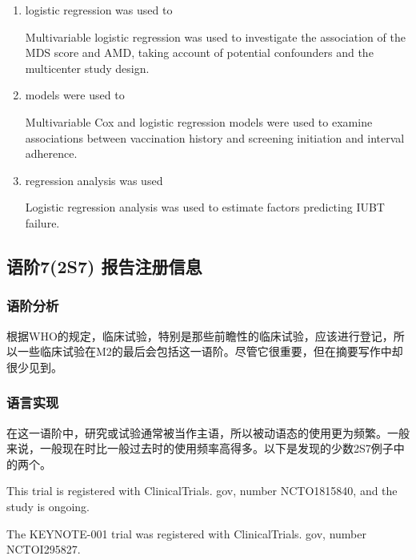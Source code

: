 \documentclass[a4paper]{ctexbook}
\begin{document}
    \begin{enumerate}
      \item logistic regression was used to
      \begin{eg}{}
        Multivariable logistic regression was used to investigate the association of the MDS score and AMD, taking account of potential confounders and the multicenter study design.   
      \end{eg}
      \item models were used to
      \begin{eg}{}
        Multivariable Cox and logistic regression models were used to examine associations between vaccination history and screening initiation and interval adherence. 
      \end{eg}
      \item regression analysis was used
      \begin{eg}{}
        Logistic regression analysis was used to estimate factors predicting IUBT failure.   
      \end{eg}
    \end{enumerate}

  \subsection{语阶7(2S7) 报告注册信息}

    \subsubsection{语阶分析}

    根据WHO的规定，临床试验，特别是那些前瞻性的临床试验，应该进行登记，所以一些临床试验在M2的最后会包括这一语阶。尽管它很重要，但在摘要写作中却很少见到。

    \subsubsection{语言实现}

    在这一语阶中，研究或试验通常被当作主语，所以被动语态的使用更为频繁。一般来说，一般现在时比一般过去时的使用频率高得多。以下是发现的少数2S7例子中的两个。

    \begin{eg}{}
      This trial is registered with ClinicalTrials. gov, number NCTO1815840, and the study is ongoing.
    \end{eg}

    \begin{eg}{}
      The KEYNOTE-001 trial was registered with ClinicalTrials. gov, number NCTOI295827.  
    \end{eg}
\end{document}

